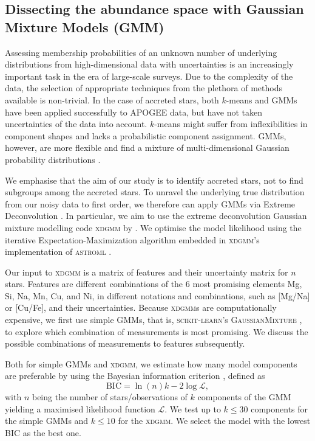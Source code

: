 \documentclass[fleqn,usenatbib]{mnras}
\begin{document}
\subsection{Dissecting the abundance space with Gaussian Mixture Models (GMM)} \label{sec:gaussian_mixture_models}

Assessing membership probabilities of an unknown number of underlying distributions from high-dimensional data with uncertainties is an increasingly important task in the era of large-scale surveys. Due to the complexity of the data, the selection of appropriate techniques from the plethora of methods available is non-trivial. In the case of accreted stars, both $k$-means \citep{Hayes2018, Mackereth2019} and GMMs \citep{Das2020} have been applied successfully to APOGEE data, but have not taken uncertainties of the data into account. $k$-means might suffer from inflexibilities in component shapes and lacks a probabilistic component assignment. GMMs, however, are more flexible and find a mixture of multi-dimensional Gaussian probability distributions \citep{VanderPlas2016}.

We emphasise that the aim of our study is to identify accreted stars, not to find subgroups among the accreted stars. To unravel the underlying true distribution from our noisy data to first order, we therefore can apply GMMs via Extreme Deconvolution \citep[XD,][]{Bovy2011}. In particular, we aim to use the extreme deconvolution Gaussian mixture modelling code \textsc{xdgmm} by \citet{Holoien2017}. We optimise the model likelihood using the iterative Expectation-Maximization algorithm \citep{Dempster1977} embedded in \textsc{xdgmm}'s implementation of \textsc{astroml} \citep{astroml}.

Our input to \textsc{xdgmm} is a matrix of features and their uncertainty matrix for $n$ stars. Features are different combinations of the 6 most promising elements Mg, Si, Na, Mn, Cu, and Ni, in different notations and combinations, such as [Mg/Na] or [Cu/Fe], and their uncertainties. Because \textsc{xdgmm}s are computationally expensive, we first use simple GMMs, that is, \textsc{scikit-learn}'s \textsc{GaussianMixture} \citep{scikit-learn}, to explore which combination of measurements is most promising. We discuss the possible combinations of measurements to features subsequently.

Both for simple GMMs and \textsc{xdgmm}, we estimate how many model components are preferable by using the Bayesian information criterion \citep[BIC,][]{Schwarz1978}, defined as 
\begin{equation}
\text{BIC} = \ln (n) k - 2 \log \mathcal{L},
\end{equation}
with $n$ being the number of stars/observations of $k$ components of the GMM yielding a maximised likelihood function $\mathcal{L}$. We test up to $k \leq 30$ components for the simple GMMs and $k \leq 10$ for the \textsc{xdgmm}. We select the model with the lowest BIC as the best one.
\end{document}
